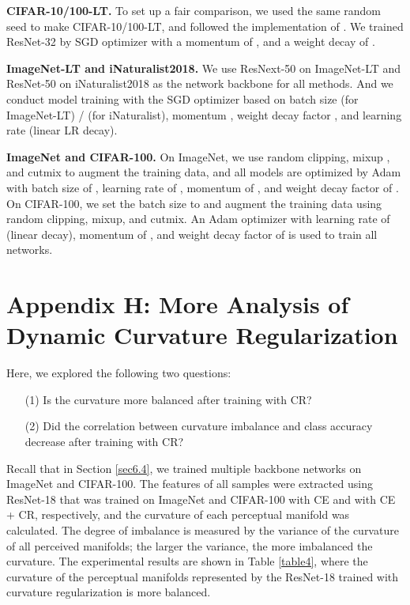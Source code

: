 \documentclass[10pt,twocolumn,letterpaper]{article}
\begin{document}
\textbf{CIFAR-10/100-LT.} To set up a fair comparison, we used the same random seed to make CIFAR-10/100-LT, and followed the implementation of \cite{paper2}. We trained ResNet-32 by SGD optimizer with a momentum of , and a weight decay of .

\textbf{ImageNet-LT and iNaturalist2018.} We use ResNext-50 \cite{paper20} on ImageNet-LT and ResNet-50 \cite{paper21} on iNaturalist2018 as the network backbone for all methods. And we conduct model training with the SGD optimizer based on batch size  (for ImageNet-LT) /  (for iNaturalist), momentum , weight decay factor , and learning rate  (linear LR decay).

\textbf{ImageNet and CIFAR-100.} On ImageNet, we use random clipping, mixup \cite{paper22}, and cutmix \cite{paper23} to augment the training data, and all models are optimized by Adam with batch size of , learning rate of , momentum of , and weight decay factor of . On CIFAR-100, we set the batch size to  and augment the training data using random clipping, mixup, and cutmix. An Adam optimizer with learning rate of  (linear decay), momentum of , and weight decay factor of  is used to train all networks.


\section*{Appendix H: More Analysis of Dynamic Curvature Regularization}
\label{secH}

Here, we explored the following two questions:
\begin{itemize}
\item[(1)] Is the curvature more balanced after training with CR? 
\item[(2)] Did the correlation between curvature imbalance and class accuracy decrease after training with CR?
\end{itemize}

Recall that in Section \ref{sec6.4}, we trained multiple backbone networks on ImageNet and CIFAR-100. The features of all samples were extracted using ResNet-18 that was trained on ImageNet and CIFAR-100 with CE and with CE + CR, respectively, and the curvature of each perceptual manifold was calculated. The degree of imbalance is measured by the variance of the curvature of all perceived manifolds; the larger the variance, the more imbalanced the curvature. The experimental results are shown in Table \ref{table4}, where the curvature of the perceptual manifolds represented by the ResNet-18 trained with curvature regularization is more balanced.
\end{document}
